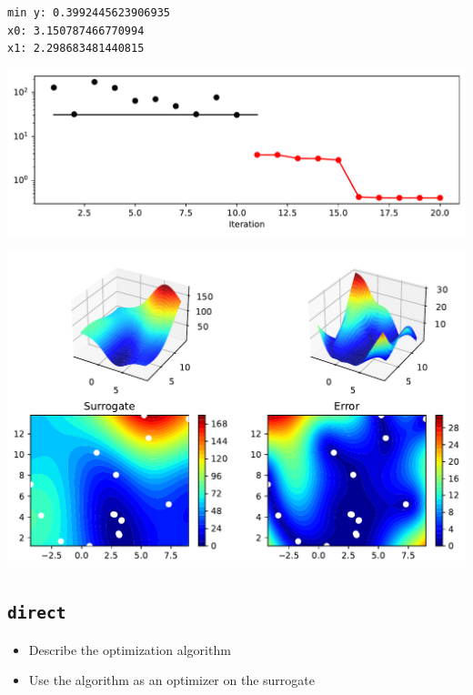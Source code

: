 \documentclass[
  letterpaper,
  DIV=11,
  numbers=noendperiod]{scrreprt}
\providecommand{\tightlist}{%
  \setlength{\itemsep}{0pt}\setlength{\parskip}{0pt}}\usepackage{longtable,booktabs,array}
\begin{document}
\begin{tcolorbox}
\begin{verbatim}
min y: 0.3992445623906935
x0: 3.150787466770994
x1: 2.298683481440815
\end{verbatim}

\includegraphics{004_spot_sklearn_optimization_files/figure-pdf/cell-9-output-2.pdf}

\includegraphics{004_spot_sklearn_optimization_files/figure-pdf/cell-9-output-3.pdf}

\end{tcolorbox}

\subsection{\texorpdfstring{\texttt{direct}}{direct}}\label{direct-1}

\begin{itemize}
\tightlist
\item
  Describe the optimization algorithm
\item
  Use the algorithm as an optimizer on the surrogate
\end{itemize}
\end{document}
